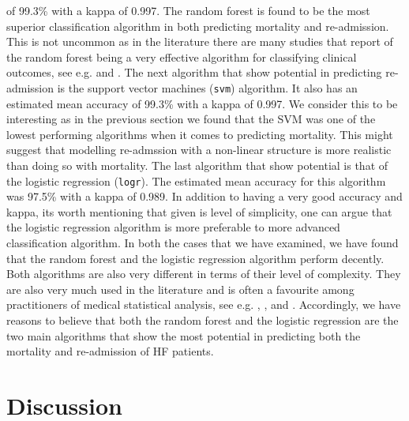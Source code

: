 \documentclass[../thesis.tex]{subfiles}
\begin{document}
\noindent of 99.3\% with a kappa of 0.997. The random forest is found to be the most superior classification algorithm in both predicting mortality and re-admission. This is not uncommon as in the literature there are many studies that report of the random forest being a very effective algorithm for classifying clinical outcomes, see e.g. \cite{austin2013using} and \cite{zolfaghar2013big}. The next algorithm that show potential in predicting re-admission is the support vector machines (\texttt{svm}) algorithm. It also has an estimated mean accuracy of 99.3\% with a kappa of 0.997. We consider this to be interesting as in the previous section we found that the SVM was one of the lowest performing algorithms when it comes to predicting mortality. This might suggest that modelling re-admssion with a non-linear structure is more realistic than doing so with mortality. The last algorithm that show potential is that of the logistic regression (\texttt{logr}). The estimated mean accuracy for this algorithm was 97.5\% with a kappa of 0.989. In addition to having a very good accuracy and kappa, its worth mentioning that given is level of simplicity, one can argue that the logistic regression algorithm is more preferable to more advanced classification algorithm. In both the cases that we have examined, we have found that the random forest and the logistic regression algorithm perform decently. Both algorithms are also very different in terms of their level of complexity. They are also very much used in the literature and is often a favourite among practitioners of medical statistical analysis, see e.g. \cite{austin2013using}, \cite{zolfaghar2013big}, \cite{shah2014phenomapping} and \cite{panahiazar2015using}. Accordingly, we have reasons to believe that both the random forest and the logistic regression are the two main algorithms that show the most potential in predicting both the mortality and re-admission of HF patients.

\section{Discussion}
\end{document}
